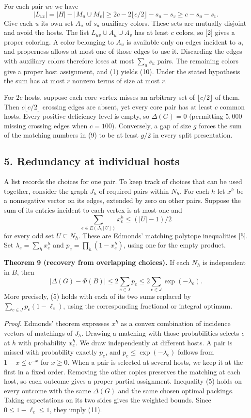 \documentclass[english,11pt,a4paper]{article}
\begin{document}
For each pair \(uv\) we have \[
|L_{uv}|=|H|-|M_u\cup M_v|\ge 2c-2\lfloor c/2\rfloor-s_u-s_v\ge c-s_u-s_v .
\] Give each \(u\) its own set \(A_u\) of \(s_u\) auxiliary colors. These sets are mutually disjoint and avoid the hosts. The list \(L_{uv}\cup A_u\cup A_v\) has at least \(c\) colors, so {[}2{]} gives a proper coloring. A color belonging to \(A_u\) is available only on edges incident to \(u\), and properness allows at most one of those edges to use it. Discarding the edges with auxiliary colors therefore loses at most \(\sum_u s_u\) pairs. The remaining colors give a proper host assignment, and (1) yields (10). Under the stated hypothesis the sum has at most \(r\) nonzero terms of size at most \(r\).

For \(2c\) hosts, suppose each core vertex misses an arbitrary set of \(\lfloor c/2\rfloor\) of them. Then \(c\lfloor c/2\rfloor\) crossing edges are absent, yet every core pair has at least \(c\) common hosts. Every positive deficiency level is empty, so \(\Delta(G)=0\) (permitting \(5{,}000\) missing crossing edges when \(c=100\)). Conversely, a gap of size \(g\) forces the sum of the matching numbers in (9) to be at least \(g/2\) in every split presentation.

\subsection{5. Redundancy at individual hosts}\label{redundancy-at-individual-hosts}

A list records the choices for one pair. To keep track of choices that can be used together, consider the graph \(J_h\) of required pairs within \(N_h\). For each \(h\) let \(x^h\) be a nonnegative vector on its edges, extended by zero on other pairs. Suppose the sum of its entries incident to each vertex is at most one and \[
\sum_{e\in E(J_h[U])}x^h_e\le (|U|-1)/2
\] for every odd set \(U\subseteq N_h\). These are Edmonds' matching polytope inequalities {[}5{]}. Set \(\lambda_e=\sum_h x^h_e\) and \(p_e=\prod_h(1-x^h_e)\), using one for the empty product.

\textbf{Theorem 9 (recovery from overlapping choices).} If each \(N_h\) is independent in \(B\), then \[
|\Delta(G)-\Phi(B)|\le 2\sum_{e\in J}p_e
                  \le 2\sum_{e\in J}\exp(-\lambda_e). \tag{11}
\] More precisely, (5) holds with each of its two sums replaced by \(\sum_{e\in J}p_e(1-\ell_e)\), using the corresponding fractional or integral optimum.

\emph{Proof.} Edmonds' theorem expresses \(x^h\) as a convex combination of incidence vectors of matchings of \(J_h\). Drawing a matching with those probabilities selects \(e\) at \(h\) with probability \(x^h_e\). We draw independently at different hosts. A pair is missed with probability exactly \(p_e\), and \(p_e\le\exp(-\lambda_e)\) follows from \(1-x\le e^{-x}\) for \(x\ge0\). When a pair is selected at several hosts, we keep it at the first in a fixed order. Removing the other copies preserves the matching at each host, so each outcome gives a proper partial assignment. Inequality (5) holds on every outcome with the same \(\Delta(G)\) and the same chosen optimal packings. Taking expectations on its two sides gives the weighted bounds. Since \(0\le1-\ell_e\le1\), they imply (11).
\end{document}
